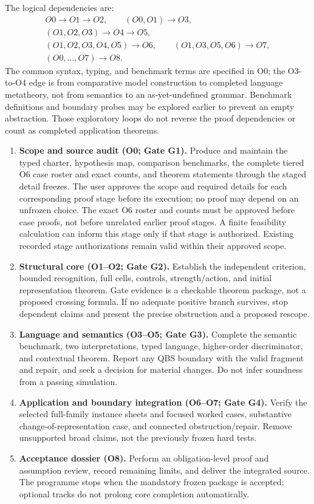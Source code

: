 \documentclass[11pt,a4paper]{article}
\begin{document}
The logical dependencies are:
\[
 \begin{gathered}
 O0\longrightarrow O1\longrightarrow O2,\qquad
 (O0,O1)\longrightarrow O3,\\
 (O1,O2,O3)\longrightarrow O4\longrightarrow O5,\\
 (O1,O2,O3,O4,O5)\longrightarrow O6,\qquad
 (O1,O3,O5,O6)\longrightarrow O7,\\
 (O0,\ldots,O7)\longrightarrow O8.
 \end{gathered}
\]
The common syntax, typing, and benchmark terms are specified in O0; the
O3-to-O4 edge is from comparative model construction to completed language
metatheory, not from semantics to an as-yet-undefined grammar.
Benchmark definitions and boundary probes may be explored earlier to prevent
an empty abstraction. Those exploratory loops do not reverse the proof
dependencies or count as completed application theorems.

\begin{enumerate}[label=\textbf{Stage \arabic*.}]
\item \textbf{Scope and source audit (O0; Gate G1).}
Produce and maintain the typed charter, hypothesis map, comparison benchmarks,
the complete tiered O6 case roster and exact counts, and theorem statements
through the staged detail freezes. The user approves the scope and required
details for each corresponding proof stage before its execution; no proof
may depend on an unfrozen choice. The exact O6 roster and counts must be
approved before case proofs, not before unrelated earlier proof stages.
A finite feasibility calculation can inform this stage only if that stage
is authorized. Existing recorded stage authorizations remain valid within
their approved scope.
\item \textbf{Structural core (O1--O2; Gate G2).}
Establish the independent criterion, bounded recognition, full cells,
controls, strength/action, and initial representation theorem. Gate evidence
is a checkable theorem package, not a proposed crossing formula. If no
adequate positive branch survives, stop dependent claims and present the
precise obstruction and a proposed rescope.
\item \textbf{Language and semantics (O3--O5; Gate G3).}
Complete the semantic benchmark, two interpretations, typed language,
higher-order discriminator, and contextual theorem. Report any QBS boundary
with the valid fragment and repair, and seek a decision for material changes.
Do not infer soundness from a passing simulation.
\item \textbf{Application and boundary integration (O6--O7; Gate G4).}
Verify the selected full-family instance sheets and focused worked cases,
substantive change-of-representation case, and connected obstruction/repair.
Remove unsupported broad claims,
not the previously frozen hard tests.
\item \textbf{Acceptance dossier (O8).}
Perform an obligation-level proof and assumption review, record remaining
limits, and deliver the integrated source. The programme stops when the
mandatory frozen package is accepted; optional tracks do not prolong core
completion automatically.
\end{enumerate}
\end{document}
